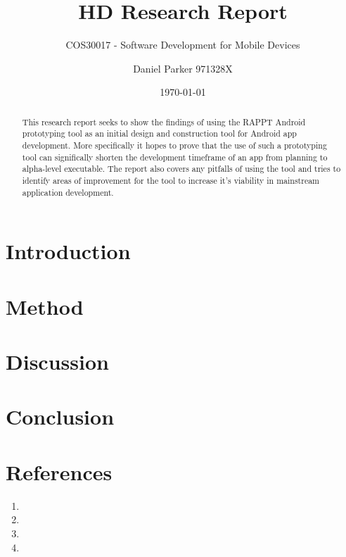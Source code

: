 \documentclass[11pt,english,numbers=endperiod,parskip=half,abstract=on]{scrreprt}
\title{HD Research Report}
\subtitle{COS30017 - Software Development for Mobile Devices}
\author{Daniel Parker 971328X}
\date{\today}
\begin{document}
\maketitle
\begin{abstract}
  This research report seeks to show the findings of using the RAPPT Android
  prototyping tool as an initial design and construction tool for Android app
  development. More specifically it hopes to prove that the use of such a
  prototyping tool can significally shorten the development timeframe of an app
  from planning to alpha-level executable. The report also covers any pitfalls
  of using the tool and tries to identify areas of improvement for the tool to
  increase it's viability in mainstream application development.
\end{abstract}
\thispagestyle{empty}

\section{Introduction}

\section{Method}

\section{Discussion}

\section{Conclusion}

\section{References}
  \begin{enumerate}
    \item{

    }
    \item{

    }
    \item{

    }
    \item{

    }
  \end{enumerate}
\end{document}
